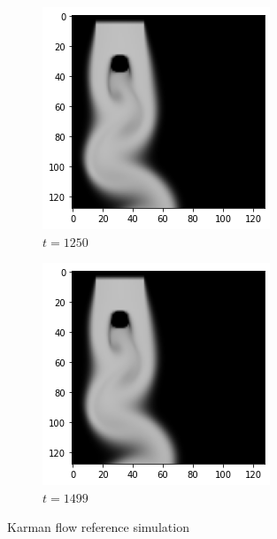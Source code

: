 \documentclass[a4paper,12pt,twoside]{report}
\begin{document}
\begin{figure}
\begin{subfigure}{0.18\textwidth}
	\end{subfigure}
	\begin{subfigure}{0.18\textwidth}
		\centering
		\includegraphics[scale=0.3]{timecost/ref1250.png}
		\caption{$t=1250$}
	\end{subfigure}
	\begin{subfigure}{0.18\textwidth}
		\centering
		\includegraphics[scale=0.3]{timecost/ref1499.png}
		\caption{$t=1499$}
	\end{subfigure}
	\caption{Karman flow reference simulation}
	\label{timecost ref}
\end{figure}
\end{document}
